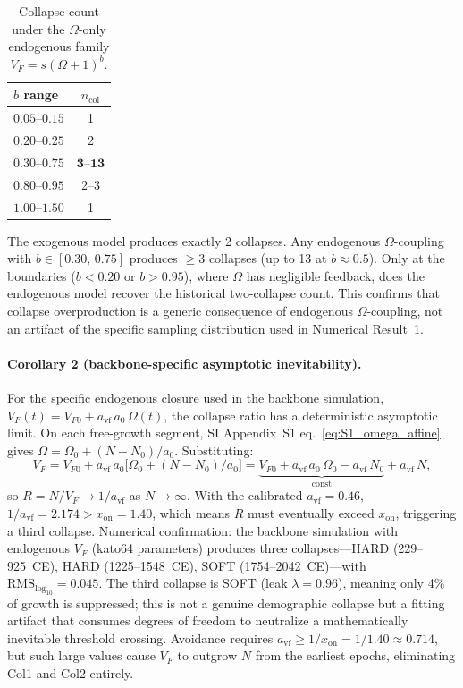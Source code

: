 \documentclass[11pt]{article}
\begin{document}
\begin{table}[H]
\centering
\caption{Collapse count under the $\Omega$-only endogenous family $V_F=s(\Omega+1)^b$.}
\label{tab:S1_omega_sweep}
\begin{tabular}{lc}
\toprule
$b$ range & $n_{\mathrm{col}}$ \\
\midrule
$0.05$--$0.15$ & 1 \\
$0.20$--$0.25$ & 2 \\
$\mathbf{0.30}$--$\mathbf{0.75}$ & $\mathbf{3}$--$\mathbf{13}$ \\
$0.80$--$0.95$ & 2--3 \\
$1.00$--$1.50$ & 1 \\
\bottomrule
\end{tabular}
\end{table}

\noindent
The exogenous model produces exactly 2 collapses.
Any endogenous $\Omega$-coupling with $b\in[0.30,\,0.75]$ produces $\ge 3$ collapses (up to 13 at $b\approx 0.5$).
Only at the boundaries ($b<0.20$ or $b>0.95$), where $\Omega$ has negligible feedback, does the endogenous model recover the historical two-collapse count.
This confirms that collapse overproduction is a generic consequence of endogenous $\Omega$-coupling, not an artifact of the specific sampling distribution used in Numerical Result~1.

\paragraph{Corollary 2 (backbone-specific asymptotic inevitability).}
For the specific endogenous closure used in the backbone simulation,
$V_F(t)=V_{F0}+a_{\mathrm{vf}}\,a_0\,\Omega(t)$,
the collapse ratio has a deterministic asymptotic limit.
On each free-growth segment, SI Appendix~S1 eq.~\eqref{eq:S1_omega_affine} gives
$\Omega=\Omega_0+(N-N_0)/a_0$. Substituting:
\begin{equation}
V_F = V_{F0} + a_{\mathrm{vf}}\,a_0\bigl[\Omega_0+(N-N_0)/a_0\bigr]
    = \underbrace{V_{F0}+a_{\mathrm{vf}}\,a_0\,\Omega_0 - a_{\mathrm{vf}}\,N_0}_{\text{const}} + a_{\mathrm{vf}}\,N,
\label{eq:S1_VF_endo_asymptotic}
\end{equation}
so $R=N/V_F \to 1/a_{\mathrm{vf}}$ as $N\to\infty$.
With the calibrated $a_{\mathrm{vf}}=0.46$, $1/a_{\mathrm{vf}}=2.174>x_{\mathrm{on}}=1.40$,
which means $R$ must eventually exceed $x_{\mathrm{on}}$, triggering a third collapse.
Numerical confirmation: the backbone simulation with endogenous $V_F$ (kato64 parameters)
produces three collapses---HARD (229--925~CE), HARD (1225--1548~CE), SOFT (1754--2042~CE)---with
$\mathrm{RMS}_{\log_{10}}=0.045$. The third collapse is SOFT (leak $\lambda=0.96$), meaning only 4\%
of growth is suppressed; this is not a genuine demographic collapse but a fitting artifact
that consumes degrees of freedom to neutralize a mathematically inevitable threshold crossing.
Avoidance requires $a_{\mathrm{vf}}\ge 1/x_{\mathrm{on}}=1/1.40\approx 0.714$, but such large values cause
$V_F$ to outgrow $N$ from the earliest epochs, eliminating Col1 and Col2 entirely.
\end{document}
